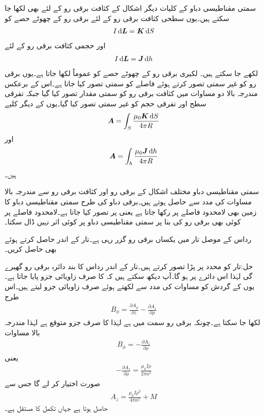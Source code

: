 سمتی مقناطیسی دباو  کے کلیات دیگر اشکال کے کثافت برقی رو کے لئے بھی لکھا جا سکتے ہیں۔یوں سطحی کثافت برقی رو  کے لئے  برقی رو کے چھوٹے حصے کو
\begin{align*}
I \dif \kvec{L}=\kvec{K} \dif S
\end{align*}
اور حجمی کثافت برقی رو  کے لئے
\begin{align*}
I \dif \kvec{L}=\kvec{J} \dif h
\end{align*}
لکھے جا سکتے ہیں۔ لکیری برقی رو کے چھوٹے حصے کو عموماً  لکھا جاتا ہے۔یوں برقی رو کو غیر سمتی تصور کرتے ہوئے فاصلے کو سمتی تصور کیا جاتا ہے۔اس کے برعکس مندرجہ بالا دو مساوات میں کثافت برقی رو کو سمتی مقدار تصور کیا گیا جبکہ تفرقی سطح  اور تفرقی حجم  کو غیر سمتی تصور کیا گیا۔یوں  کے دیگر کلیے 
\begin{align}
\kvec{A}=\int_S \frac{\mu_0 \kvec{K} \dif S}{4\pi R}
\end{align}
اور
\begin{align}\label{مساوات_مقناطیسی_سمتی_مقناطیسی_دباو_حجمی_رو}
\kvec{A}=\int_h \frac{\mu_0 \kvec{J} \dif h}{4\pi R}
\end{align}
ہیں۔ 

سمتی مقناطیسی دباو مختلف اشکال کے برقی رو اور کثافت برقی رو سے مندرجہ بالا مساوات کی مدد سے حاصل ہوتے ہیں۔برقی دباو کی طرح سمتی مقناطیسی دباو کا زمین بھی لامحدود فاصلے پر رکھا جاتا ہے یعنی  پر  تصور کیا جاتا ہے۔لامحدود فاصلے پر کوئی بھی برقی رو  کی بنا پر سمتی مقناطیسی دباو پر کوئی اثر نہیں ڈال سکتا۔

رداس  کے موصل تار میں یکساں برقی رو  گزر رہی ہے۔تار کے اندر  حاصل کرتے ہوئے  بھی حاصل کریں۔

حل:تار کو  محدد پر پڑا تصور کرتے ہیں۔تار کے اندر  رداس کا بند دائرہ  برقی رو گھیرے گی لہٰذا اس دائرے پر  ہو گا۔آپ دیکھ سکتے ہیں کہ  کا صرف زاویائی جزو پایا جاتا ہے۔یوں  کے گردش کو مساوات  کی مدد سے لکھتے ہوئے صرف زاویائی جزو لیتے ہیں۔اس طرح
\begin{align*}
B_{\phi}=\frac{\partial A_\rho}{\partial z}-\frac{\partial A_z}{\partial \rho}
\end{align*} 
لکھا جا سکتا ہے۔چونکہ برقی رو   سمت میں ہے لہٰذا  کا صرف  جزو متوقع ہے لہٰذا مندرجہ بالا مساوات 
\begin{align*}
B_{\phi}=-\frac{\partial A_z}{\partial \rho}
\end{align*} 
یعنی
\begin{align*}
-\frac{\partial A_z}{\partial \rho}=\frac{\mu_0 I \rho}{2\pi a^2}
\end{align*}
صورت  اختیار کر لے گا جس سے
\begin{align*}
A_z= \tfrac{\mu_0 I \rho^2 }{4\pi a^2} +M
\end{align*}
حاصل ہوتا ہے جہاں  تکمل کا مستقل ہے۔

